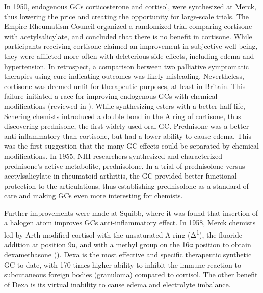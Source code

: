 \documentclass[12pt,english]{report}\usepackage[]{graphicx}\usepackage[]{color}
\begin{document}
In 1950, endogenous GCs corticosterone and cortisol, were synthesized
at Merck\citep{wendler1950synthesis}, thus lowering the price and
creating the opportunity for large-scale trials. The Empire Rheumatism
Council organized a randomized trial comparing cortisone with acetylsalicylate,
and concluded that there is no benefit in cortisone\citep{theempirerheumatismcouncilsub-committee1957multi-centre}.
While participants receiving cortisone claimed an improvement in subjective
well-being, they were afflicted more often with deleterious side effects,
including edema and hypertension. In retrospect, a comparison between
two palliative symptomatic therapies using cure-indicating outcomes
was likely misleading. Nevertheless, cortisone was deemed unfit for
therapeutic purposes, at least in Britain. This failure initiated
a race for improving endogenous GCs with chemical modifications (reviewed
in \citep{sarett1959aspects}). While synthesizing esters with a better
half-life, Schering chemists introduced a double bond in the A ring
of cortisone, thus discovering prednisone, the first widely used oral
GC\citep{herzog195511-oxygenated}. Prednisone was a better anti-inflammatory
than cortisone, but had a lower ability to cause edema. This was the
first suggestion that the many GC effects could be separated by chemical
modifications. In 1955, NIH researchers synthesized and characterized
prednisone's active metabolite, prednisolone\citep{bunim1955metabolic}.
In a trial of prednisolone versus acetylsalicylate in rheumatoid arthritis,
the GC provided better functional protection to the articulations\citep{medicalresearchcouncil1960comparison},
thus establishing prednisolone as a standard of care and making GCs
even more interesting for chemists.

Further improvements were made at Squibb, where it was found that
insertion of a halogen atom improves GCs anti-inflammatory effect\citep{fried1955synthesis,fried1953synthesis}.
In 1958, Merck chemists led by Arth modified cortisol with the unsaturated
A ring (Δ\textsuperscript{1}), the fluoride addition at position
9α, and with a methyl group on the 16α position to obtain dexamethasone
()\citep{arth195816-methylated,arth195816-methylateda}.
Dexa is the most effective and specific therapeutic synthetic GC to
date, with 170 times higher ability to inhibit the immune reaction
to subcutaneous foreign bodies (granuloma) compared to cortisol\citep{silber1959biology}.
The other benefit of Dexa is its virtual inability to cause edema
and electrolyte imbalance.
\end{document}
